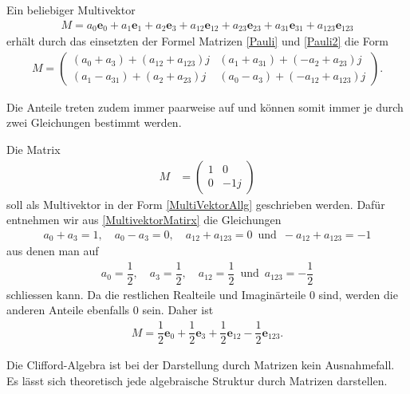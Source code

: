 \begin{hilfssatz}
	Ein beliebiger Multivektor
	\begin{align} \label{MultiVektorAllg}
		M = a_0\mathbf{e}_0 + a_1\mathbf{e}_1 + a_2\mathbf{e}_3 + a_{12}\mathbf{e}_{12} + a_{23}\mathbf{e}_{23} + a_{31}\mathbf{e}_{31} + a_{123}\mathbf{e}_{123}
	\end{align}
	erhält durch das einsetzten der Formel Matrizen \eqref{Pauli} und \eqref{Pauli2} die Form
	\begin{align}
		M =
		\begin{pmatrix}
			(a_0+a_3) + (a_{12}+a_{123})j & (a_1+a_{31})+(-a_2+a_{23})j \\
			(a_1-a_{31})+(a_2+a_{23})j & (a_0-a_3)+(-a_{12}+a_{123})j
		\end{pmatrix}.\label{MultivektorMatirx}
	\end{align}
\end{hilfssatz}
Die Anteile treten zudem immer paarweise auf und können somit immer je durch zwei Gleichungen bestimmt werden.
\begin{beispiel}
	Die Matrix
	\begin{align}
		M &= 
		\begin{pmatrix}
			1 & 0 \\
			0 & -1j
		\end{pmatrix}
	\end{align}
	soll als Multivektor in der Form \eqref{MultiVektorAllg} geschrieben werden. Dafür entnehmen wir aus \eqref{MultivektorMatirx} die Gleichungen
	\begin{align}
		a_0 + a_3 = 1,\quad a_0 - a_3 = 0,\quad a_{12}+a_{123} = 0\enspace\text{und}\enspace -a_{12}+a_{123}=-1
	\end{align}
	aus denen man auf
	\begin{align}
		a_0 = \dfrac{1}{2},\quad a_3 = \dfrac{1}{2},\quad a_{12}=\dfrac{1}{2}\enspace\text{und}\enspace a_{123}=-\dfrac{1}{2}
	\end{align}
	schliessen kann. Da die restlichen Realteile und Imaginärteile 0 sind, werden die anderen Anteile ebenfalls 0 sein. Daher ist
	\begin{align}
		M = \dfrac{1}{2} \mathbf{e}_0+ \dfrac{1}{2} \mathbf{e}_3 + \dfrac{1}{2} \mathbf{e}_{12} - \dfrac{1}{2} \mathbf{e}_{123}.
	\end{align}
\end{beispiel}
Die Clifford-Algebra ist bei der Darstellung durch Matrizen kein Ausnahmefall. Es lässt sich theoretisch jede algebraische Struktur durch Matrizen darstellen.